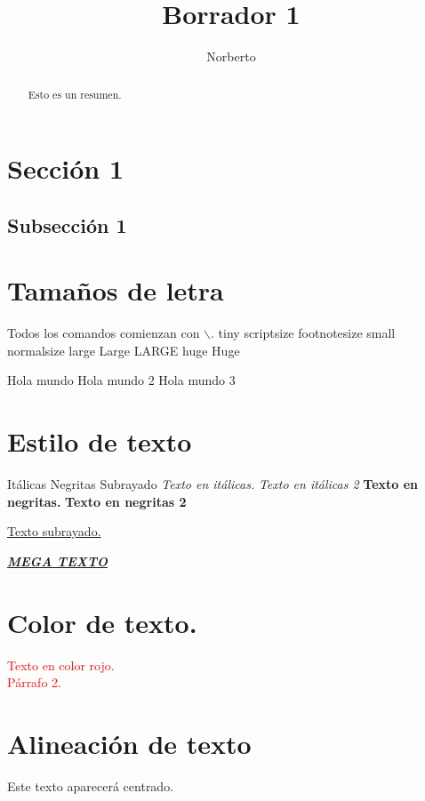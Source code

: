 \documentclass[]{article}
\title{Borrador 1}
\author{Norberto}
\begin{document}
\maketitle

\begin{abstract}
Esto es un resumen.
\end{abstract}

\section{Sección 1}
\subsection{Subsección 1}

\section{Tamaños de letra}
Todos los comandos comienzan con $\backslash$.
tiny
scriptsize
footnotesize
small
normalsize
large
Large
LARGE
huge
Huge

\normalsize
Hola mundo
{\small Hola mundo 2}
Hola mundo 3

\section{Estilo de texto}
Itálicas
Negritas
Subrayado
\textit{Texto en itálicas.} 
\textit{Texto en itálicas 2}
\textbf{Texto en negritas.}
\textbf{Texto en negritas 2}

\underline{Texto subrayado.}

\textit{\textbf{\underline{MEGA TEXTO}}}

\section{Color de texto.}
\textcolor{red}{Texto en color rojo.\\
	 Párrafo 2.}

\section{Alineación de texto}
\begin{center}
	Este texto aparecerá centrado.
\end{center}
\end{document}

